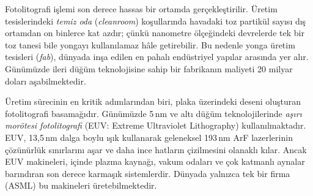 Fotolitografi işlemi son derece hassas bir ortamda gerçekleştirilir. Üretim tesislerindeki \emph{temiz oda} (\emph{cleanroom}) koşullarında havadaki toz partikül sayısı dış ortamdan on binlerce kat azdır; çünkü nanometre ölçeğindeki devrelerde tek bir toz tanesi bile yongayı kullanılamaz hâle getirebilir. Bu nedenle yonga üretim tesisleri (\emph{fab}), dünyada inşa edilen en pahalı endüstriyel yapılar arasında yer alır. Günümüzde ileri düğüm teknolojisine sahip bir fabrikanın maliyeti 20 milyar doları aşabilmektedir.

Üretim sürecinin en kritik adımlarından biri, plaka üzerindeki deseni oluşturan fotolitografi basamağıdır. Günümüzde 5\,nm ve altı düğüm teknolojilerinde \emph{aşırı morötesi fotolitografi} (EUV: Extreme Ultraviolet Lithography) kullanılmaktadır. EUV, 13{,}5\,nm dalga boylu ışık kullanarak geleneksel 193\,nm ArF lazerlerinin çözünürlük sınırlarını aşar ve daha ince hatların çizilmesini olanaklı kılar. Ancak EUV makineleri, içinde plazma kaynağı, vakum odaları ve çok katmanlı aynalar barındıran son derece karmaşık sistemlerdir. Dünyada yalnızca tek bir firma (ASML) bu makineleri üretebilmektedir.

